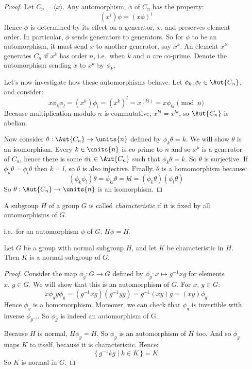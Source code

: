 \begin{proof}
    Let \(C_n = \langle x \rangle\).
    Any automorphism, \(\phi\) of \(C_n\) has the property:
    \[(x^i)\phi = {(x\phi)}^i\]
    Hence \(\phi\) is determined by its effect on a generator, \(x\), and preserves element
    order.
    In particular, \(\phi\) sends generators to generators.
    So for \(\phi\) to be an automorphism, it must send \(x\) to another generator, say \(x^k\).
    An element \(x^k\) generates \(C_n\) if \(x^k\) has order \(n\), i.e.\ when \(k\) and \(n\) are co-prime.
    Denote the automorphism sending \(x\) to \(x^k\) by \(\phi_k\).

    Let's now investigate how these automorphisms behave.
    Let \(\phi_k, \phi_l \in \Aut{C_n}\), and consider:
    \[x\phi_k\phi_l = (x^k)\phi_l = {(x^k)}^l = x^{(kl)} = x\phi_{kl} \pmod{n}\]
    Because multiplication modulo \(n\) is commutative, \(x^{kl} = x^{lk}\), so \(\Aut{C_n}\) is abelian.

    Now consider \(\theta:\Aut{C_n} \to \units{n}\) defined by \(\phi_k\theta = k\).
    We will show \(\theta\) is an isomorphism.
    Every \(k \in \units{n}\) is co-prime to \(n\) and so \(x^k\) is a generator of \(C_n\), hence there is some \(\phi_k
    \in \Aut{C_n}\) such that \(\phi_k\theta = k\).
    So \(\theta\) is surjective.
    If \(\phi_k\theta = \phi_l\theta\) then \(k = l\), so \(\theta\) is also injective.
    Finally, \(\theta\) is a homomorphism because:
    \[(\phi_k\phi_l)\theta = \phi_{kl}\theta = kl = (\phi_k\theta)(\phi_l\theta)\]
    So \(\theta:\Aut{C_n} \to \units{n}\) is an isomorphism.
\end{proof}

\begin{definition}
    \raggedright
    A subgroup \(H\) of a group \(G\) is called \emph{characteristic} if it is fixed by all automorphisms of
    \(G\).

    i.e.\ for an automorphism \(\phi\) of \(G\), \(H\phi = H\).
\end{definition}

\begin{lemma}\label{lem:char}
    \raggedright
    Let \(G\) be a group with normal subgroup \(H\), and let \(K\) be characteristic in \(H\).
    Then \(K\) is a normal subgroup of \(G\).
\end{lemma}

\begin{proof}
    Consider the map \(\phi_g:G \to G\) defined by \(\phi_g:x \mapsto g^{-1}xg\) for elements \(x,\,g \in G\).
    We will show that this is an automorphism of \(G\).
    For \(x,\,y \in G\):
    \[x\phi_g y\phi_g = (g^{-1}xg)(g^{-1}yg) = g^{-1}(xy)g = (xy)\phi_g\]
    Hence \(\phi_g\) is a homomorphism.
    Moreover, we can check that \(\phi_g\) is invertible with inverse \(\phi_{g^{-1}}\).
    So \(\phi_g\) is indeed an automorphism of G.

    Because \(H\) is normal, \(H\phi_g = H\).
    So \(\phi_g\) is an automorphism of \(H\) too.
    And so \(\phi_g\) maps \(K\) to itself, because it is characteristic.
    Hence:
    \[\{\,g^{-1}kg \mid k \in K\,\} = K\]
    So \(K\) is normal in \(G\).
\end{proof}

